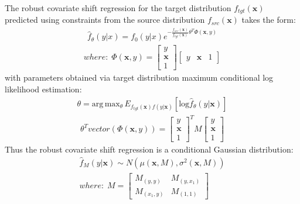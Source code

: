 \documentclass[conference,compsoc]{IEEEtran}
\begin{document}
The robust covariate shift regression for the target distribution $f_{tgt}(\textbf{x})$ predicted using constraints from the source distribution $f_{src}(\textbf{x})$ takes the form:
\begin{equation}
\begin{split}
	\hat{f}_{\theta}(y|x) = f_0(y|x)e^{-\frac{f_{src}(\textbf{x})}{f_{tgt}(\textbf{x})}\theta^T\Phi(\textbf{x},y)}
\end{split}
\end{equation}
\begin{equation}
\begin{split}
 	where: \; \Phi(\textbf{x},y) = \begin{bmatrix}
 y \\ 
 \textbf{x} \\1 
\end{bmatrix}
\begin{bmatrix}
  y&\textbf{x}&1 
\end{bmatrix}
\end{split}
\end{equation}
with parameters obtained via target distribution maximum conditional log likelihood estimation:
\begin{equation}\label{eqop}
\begin{split}
	\theta = \mathrm{arg} \, \mathrm{max}_{\theta} \, E_{f_{tgt}(\textbf{x})f(y|\textbf{x})}\left[\mathrm{log}\hat{f}_{\theta}(y|\textbf{x})\right]
\end{split}
\end{equation}
\begin{equation}
\begin{split}
	\theta^{T}vector(\Phi(\textbf{x},y)) =\begin{bmatrix}
 y \\ 
 \textbf{x} \\1 
\end{bmatrix}^T M
\begin{bmatrix}
y \\ 
 \textbf{x} \\1 
\end{bmatrix}
\end{split}
\end{equation}
Thus the robust covariate shift regression is a conditional Gaussian distribution:
\begin{equation}
\begin{split}
 	\hat{f}_M(y|\textbf{x}) \sim N(\mu(\textbf{x},M),\sigma^2(\textbf{x},M)) \\
    where: \; M = \begin{bmatrix}
 M_{(y,y)}&M_{(y,x_{1})} \\ 
 M_{(x_{1},y)}&M_{(1,1)} 
\end{bmatrix}
\end{split}
\end{equation}
\end{document}
